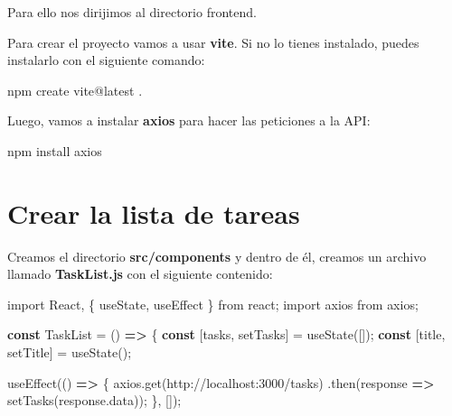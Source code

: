 \documentclass[
  a4paper,
  DIV=11,
  numbers=noendperiod,
  onepage,
  openany]{scrreprt}
\newenvironment{Shaded}{\begin{snugshade}}{\end{snugshade}}
\newcommand{\AttributeTok}[1]{\textcolor[rgb]{0.40,0.45,0.13}{#1}}
\newcommand{\ExtensionTok}[1]{\textcolor[rgb]{0.00,0.23,0.31}{#1}}
\newcommand{\FunctionTok}[1]{\textcolor[rgb]{0.28,0.35,0.67}{#1}}
\newcommand{\ImportTok}[1]{\textcolor[rgb]{0.00,0.46,0.62}{#1}}
\newcommand{\KeywordTok}[1]{\textcolor[rgb]{0.00,0.23,0.31}{\textbf{#1}}}
\newcommand{\NormalTok}[1]{\textcolor[rgb]{0.00,0.23,0.31}{#1}}
\newcommand{\OperatorTok}[1]{\textcolor[rgb]{0.37,0.37,0.37}{#1}}
\newcommand{\StringTok}[1]{\textcolor[rgb]{0.13,0.47,0.30}{#1}}
\begin{document}
\begin{tcolorbox}
Para ello nos dirijimos al directorio frontend.

Para crear el proyecto vamos a usar \textbf{vite}. Si no lo tienes
instalado, puedes instalarlo con el siguiente comando:

\begin{Shaded}
\begin{Highlighting}[]
\ExtensionTok{npm}\NormalTok{ create vite@latest .}
\end{Highlighting}
\end{Shaded}

Luego, vamos a instalar \textbf{axios} para hacer las peticiones a la
API:

\begin{Shaded}
\begin{Highlighting}[]
\ExtensionTok{npm}\NormalTok{ install axios}
\end{Highlighting}
\end{Shaded}

\section{Crear la lista de tareas}\label{crear-la-lista-de-tareas}

Creamos el directorio \textbf{src/components} y dentro de él, creamos un
archivo llamado \textbf{TaskList.js} con el siguiente contenido:

\begin{Shaded}
\begin{Highlighting}[]
\ImportTok{import}\NormalTok{ React}\OperatorTok{,}\NormalTok{ \{ useState}\OperatorTok{,}\NormalTok{ useEffect \} }\ImportTok{from} \StringTok{\textquotesingle{}react\textquotesingle{}}\OperatorTok{;}
\ImportTok{import}\NormalTok{ axios }\ImportTok{from} \StringTok{\textquotesingle{}axios\textquotesingle{}}\OperatorTok{;}

\KeywordTok{const}\NormalTok{ TaskList }\OperatorTok{=}\NormalTok{ () }\KeywordTok{=\textgreater{}}\NormalTok{ \{}
  \KeywordTok{const}\NormalTok{ [tasks}\OperatorTok{,}\NormalTok{ setTasks] }\OperatorTok{=} \FunctionTok{useState}\NormalTok{([])}\OperatorTok{;}
  \KeywordTok{const}\NormalTok{ [title}\OperatorTok{,}\NormalTok{ setTitle] }\OperatorTok{=} \FunctionTok{useState}\NormalTok{(}\StringTok{\textquotesingle{}\textquotesingle{}}\NormalTok{)}\OperatorTok{;}

  \FunctionTok{useEffect}\NormalTok{(() }\KeywordTok{=\textgreater{}}\NormalTok{ \{}
\NormalTok{    axios}\OperatorTok{.}\FunctionTok{get}\NormalTok{(}\StringTok{\textquotesingle{}http://localhost:3000/tasks\textquotesingle{}}\NormalTok{)}
      \OperatorTok{.}\FunctionTok{then}\NormalTok{(response }\KeywordTok{=\textgreater{}} \FunctionTok{setTasks}\NormalTok{(response}\OperatorTok{.}\AttributeTok{data}\NormalTok{))}\OperatorTok{;}
\NormalTok{  \}}\OperatorTok{,}\NormalTok{ [])}\OperatorTok{;}


\end{Highlighting}
\end{Shaded}
\end{tcolorbox}
\end{document}
